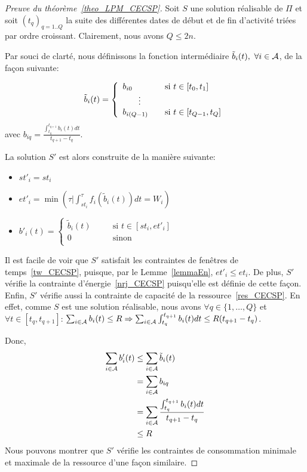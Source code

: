 \begin{proof}[Preuve du théorème~\ref{theo_LPM_CECSP}]  
  Soit $S$ une solution réalisable de $\Pi$ et soit
  $(t_q)_{q=1..Q}$ la suite des différentes dates de
  début et de fin d'activité triées par ordre croissant. Clairement,
  nous avons $Q\le 2n$. 

  Par souci de clarté, nous définissons la fonction intermédiaire
  $\tilde{b}_i(t),\ \forall i \in {\cal A}$, de la façon suivante:  

    \[\tilde{b}_i(t) =\left\{
        \begin{array}{lll}
          b_{i0} & & \text{si $t \in [t_0,t_1]$}\\
          \multicolumn{2}{c}{\vdots} &   \\
          b_{i(Q-1)} & & \text{si $t \in [t_{Q-1},t_Q]$}
        \end{array}
      \right.\]
    avec $b_{iq}=\frac{\int_{t_q}^{t_{q+1}} b_i(t) dt}{t_{q+1}-t_q}$.

    La solution $S'$ est alors construite de la manière suivante: 
    \begin{itemize}
    \item $st'_i=st_i$ 
    \item $et'_i=\min(\tau | \int_{st_i}^{\tau} f_i(\tilde{b}_i(t))dt=W_i)$
    \item $b'_i(t)= \left\{ 
        \begin{array}{lll}
          \tilde{b}_i(t) &\quad& \text{si $t \in [st_i,et'_i]$}\\
          0 &\quad& \text{sinon}\\
        \end{array}
      \right.$
    \end{itemize}

  Il est facile de voir que $S'$ satisfait les contraintes de fenêtres de
  temps~\eqref{tw_CECSP}, puisque, par le Lemme~\ref{lemmaEn},
  $et'_i\le et_i$. De plus, $S'$ vérifie la contrainte 
  d'énergie~\eqref{nrj_CECSP} puisqu'elle est définie de cette
  façon. Enfin, $S'$ vérifie aussi la contrainte de capacité de la
  ressource~\eqref{res_CECSP}. En effet, comme $S$ est une solution
  réalisable, nous avons $\forall q \in \{1,\dots,Q\}$ et $\forall t
  \in [t_q,t_{q+1}]$:  
  $\sum_{i\in {\cal A}}b_i(t) \le R \Rightarrow  
  \sum_{i\in {\cal A}} \int_{t_q}^{t_{q+1}} b_i(t)dt \le R(t_{q+1}-t_q)$.
 
  Donc, 
  \begin{align*}
    \sum_{i\in {\cal A}}b'_i(t) &\le 
                            \sum_{i\in {\cal A}} \tilde{b}_i(t)\\
                          &= 
                            \sum_{i\in {\cal A}} b_{iq}\\
                          &=
                            \sum_{i\in {\cal A}} \frac{\int_{t_q}^{t_{q+1}} b_i(t)dt}{t_{q+1}-t_q} \\
                          &\le R
  \end{align*}
  Nous pouvons montrer que $S'$ vérifie les contraintes de
  consommation minimale et maximale de la ressource d'une façon
  similaire. 
\end{proof}

